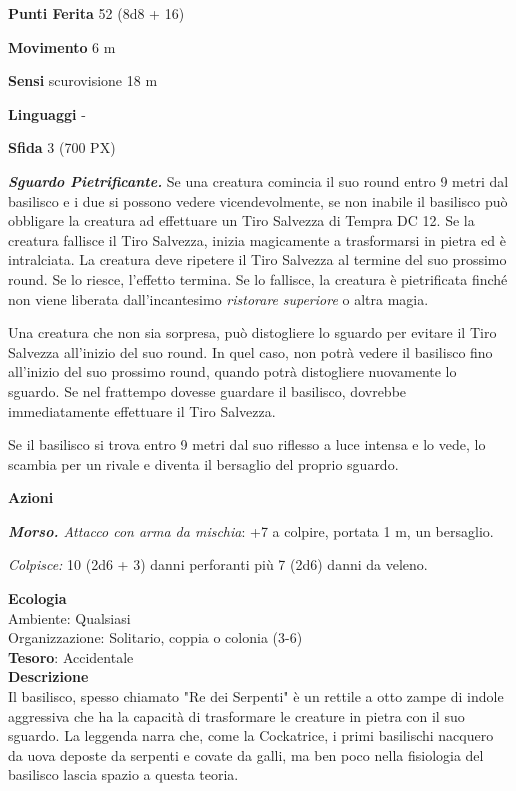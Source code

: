 \begin{multicols}{2}
\textbf{Punti Ferita} 52 (8d8 + 16)

\textbf{Movimento} 6 m

\textbf{Sensi} scurovisione 18 m

\textbf{Linguaggi} -

\textbf{Sfida} 3 (700 PX)

\textit{\textbf{Sguardo Pietrificante.}} Se una creatura comincia il suo round entro 9 metri dal basilisco e i due si possono vedere vicendevolmente, se non inabile il basilisco può obbligare la creatura ad effettuare un Tiro Salvezza di Tempra DC 12. Se la creatura fallisce il Tiro Salvezza, inizia magicamente a trasformarsi in pietra ed è intralciata. La creatura deve ripetere il Tiro Salvezza al termine del suo prossimo round. Se lo riesce, l'effetto termina. Se lo fallisce, la creatura è pietrificata finché non viene liberata dall'incantesimo \textit{ristorare} \textit{superiore} o altra magia.

Una creatura che non sia sorpresa, può distogliere lo sguardo per evitare il Tiro Salvezza all'inizio del suo round. In quel caso, non potrà vedere il basilisco fino all'inizio del suo prossimo round, quando potrà distogliere nuovamente lo sguardo. Se nel frattempo dovesse guardare il basilisco, dovrebbe immediatamente effettuare il Tiro Salvezza.

Se il basilisco si trova entro 9 metri dal suo riflesso a luce intensa e lo vede, lo scambia per un rivale e diventa il bersaglio del proprio sguardo.

\textbf{Azioni}

\textit{\textbf{Morso.} Attacco con arma da mischia}: +7 a colpire, portata 1 m, un bersaglio.

\textit{Colpisce:} 10 (2d6 + 3) danni perforanti più 7 (2d6) danni da veleno.

\textbf{Ecologia}\\
Ambiente: Qualsiasi\\
Organizzazione: Solitario, coppia o colonia (3-6)\\
\textbf{Tesoro}: Accidentale\\
\textbf{Descrizione}\\
Il basilisco, spesso chiamato "Re dei Serpenti" è un rettile a otto zampe di indole aggressiva che ha la capacità di trasformare le creature in pietra con il suo sguardo. La leggenda narra che, come la Cockatrice, i primi basilischi nacquero da uova deposte da serpenti e covate da galli, ma ben poco nella fisiologia del basilisco lascia spazio a questa teoria.


\end{multicols}
